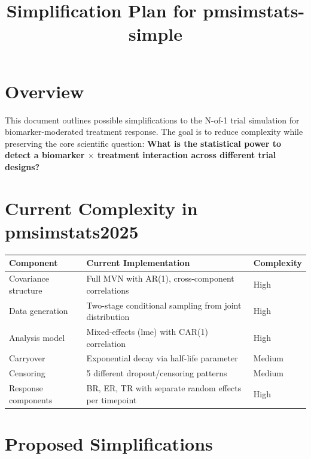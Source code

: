 \documentclass[11pt,letterpaper]{article}
\title{Simplification Plan for pmsimstats-simple}
\author{}
\date{}
\begin{document}
\maketitle
\thispagestyle{fancy}
\tableofcontents
\newpage

\section{Overview}

This document outlines possible simplifications to the N-of-1 trial
simulation for biomarker-moderated treatment response. The goal is to
reduce complexity while preserving the core scientific question:
\textbf{What is the statistical power to detect a biomarker $\times$
treatment interaction across different trial designs?}


\section{Current Complexity in pmsimstats2025}

\begin{table}[h]
\centering
\begin{tabular}{@{}lll@{}}
\toprule
Component & Current Implementation & Complexity \\
\midrule
Covariance structure & Full MVN with AR(1), cross-component correlations & High \\
Data generation & Two-stage conditional sampling from joint distribution & High \\
Analysis model & Mixed-effects (lme) with CAR(1) correlation & High \\
Carryover & Exponential decay via half-life parameter & Medium \\
Censoring & 5 different dropout/censoring patterns & Medium \\
Response components & BR, ER, TR with separate random effects per timepoint & High \\
\bottomrule
\end{tabular}
\end{table}


\section{Proposed Simplifications}
\end{document}

